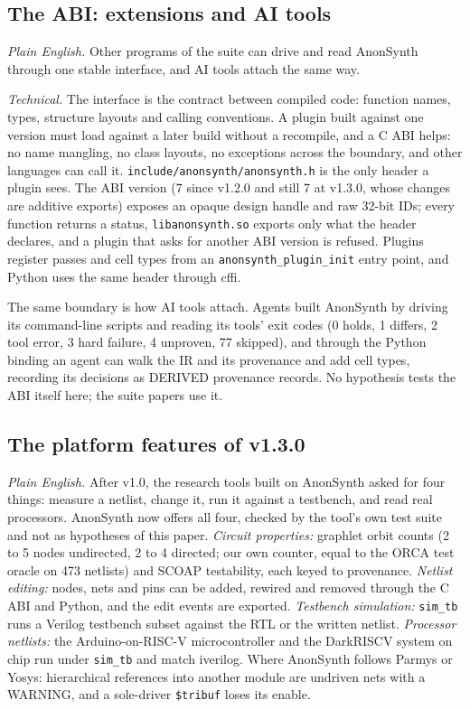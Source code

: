 \documentclass[conference]{IEEEtran}
\newcommand{\code}[1]{\texttt{#1}}
\begin{document}
\subsection{The ABI: extensions and AI tools}
\label{sec:abi-summary}

\emph{Plain English.} Other programs of the suite can drive and read AnonSynth through one stable interface, and AI tools attach the same way.

\emph{Technical.} The interface is the contract between compiled code: function names, types, structure layouts and calling conventions. A plugin built against one version must load against a later build without a recompile, and a C ABI helps: no name mangling, no class layouts, no exceptions across the boundary, and other languages can call it. \code{include/anonsynth/anonsynth.h} is the only header a plugin sees. The ABI version (7 since v1.2.0 and still 7 at v1.3.0, whose changes are additive exports) exposes an opaque design handle and raw 32-bit IDs; every function returns a status, \code{libanonsynth.so} exports only what the header declares, and a plugin that asks for another ABI version is refused. Plugins register passes and cell types from an \code{anonsynth\_plugin\_init} entry point, and Python uses the same header through cffi.

The same boundary is how AI tools attach. Agents built AnonSynth by driving its command-line scripts and reading its tools' exit codes (0 holds, 1 differs, 2 tool error, 3 hard failure, 4 unproven, 77 skipped), and through the Python binding an agent can walk the IR and its provenance and add cell types, recording its decisions as DERIVED provenance records. No hypothesis tests the ABI itself here; the suite papers use it.

\subsection{The platform features of v1.3.0}
\label{sec:platform}

\emph{Plain English.} After v1.0, the research tools built on AnonSynth asked for four things: measure a netlist, change it, run it against a testbench, and read real processors. AnonSynth now offers all four, checked by the tool's own test suite and not as hypotheses of this paper. \emph{Circuit properties:} graphlet orbit counts (2 to 5 nodes undirected, 2 to 4 directed; our own counter, equal to the ORCA test oracle on 473 netlists) and SCOAP testability, each keyed to provenance. \emph{Netlist editing:} nodes, nets and pins can be added, rewired and removed through the C ABI and Python, and the edit events are exported. \emph{Testbench simulation:} \code{sim\_tb} runs a Verilog testbench subset against the RTL or the written netlist. \emph{Processor netlists:} the Arduino-on-RISC-V microcontroller and the DarkRISCV system on chip run under \code{sim\_tb} and match iverilog. Where AnonSynth follows Parmys or Yosys: hierarchical references into another module are undriven nets with a WARNING, and a sole-driver \code{\$tribuf} loses its enable.
\end{document}
